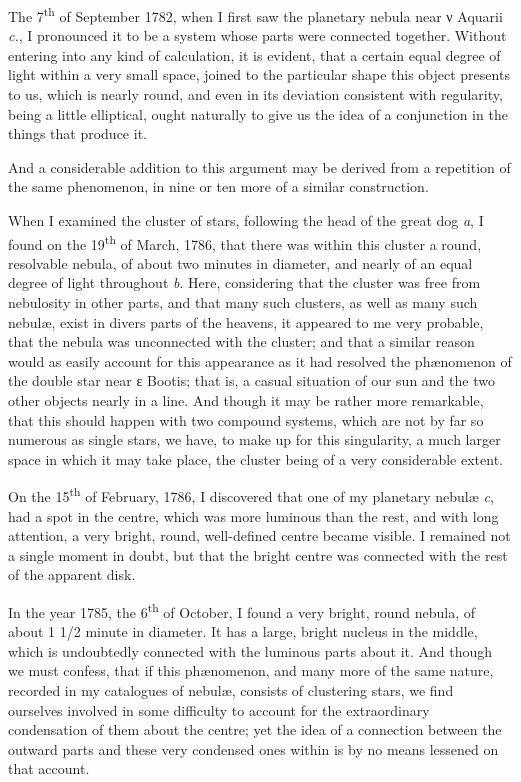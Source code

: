 \documentclass[a4paper, 12pt, oneside, polutonikogreek, english]{article}
\begin{document}
The 7\textsuperscript{th} of September 1782, when I first saw the planetary nebula near ν Aquarii \emph{c.}, I pronounced it to be a system whose parts were connected together. Without entering into any kind of calculation, it is evident, that a certain equal degree of light within a very small space, joined to the particular shape this object presents to us, which is nearly round, and even in its deviation consistent with regularity, being a little elliptical, ought naturally to give us the idea of a conjunction in the things that produce it.

And a considerable addition to this argument may be derived from a repetition of the same phenomenon, in nine or ten more of a similar construction.

When I examined the cluster of stars, following the head of the great dog \emph{a}, I found on the 19\textsuperscript{th} of March, 1786, that there was within this cluster a round, resolvable nebula, of about two minutes in diameter, and nearly of an equal degree of light throughout \emph{b}. Here, considering that the cluster was free from nebulosity in other parts, and that many such clusters, as well as many such nebulæ, exist in divers parts of the heavens, it appeared to me very probable, that the nebula was unconnected with the cluster; and that a similar reason would as easily account for this appearance as it had resolved the phænomenon of the double star near ε Bootis; that is, a casual situation of our sun and the two other objects nearly in a line. And though it may be rather more remarkable, that this should happen with two compound systems, which are not by far so numerous as single stars, we have, to make up for this singularity, a much larger space in which it may take place, the cluster being of a very considerable extent.

On the 15\textsuperscript{th} of February, 1786, I discovered that one of my planetary nebulæ \emph{c}, had a spot in the centre, which was more luminous than the rest, and with long attention, a very bright, round, well-defined centre became visible. I remained not a single moment in doubt, but that the bright centre was connected with the rest of the apparent disk.

In the year 1785, the 6\textsuperscript{th} of October, I found a very bright, round nebula, of about 1 1/2 minute in diameter. It has a large, bright nucleus in the middle, which is undoubtedly connected with the luminous parts about it. And though we must confess, that if this phænomenon, and many more of the same nature, recorded in my catalogues of nebulæ, consists of clustering stars, we find ourselves involved in some difficulty to account for the extraordinary condensation of them about the centre; yet the idea of a connection between the outward parts and these very condensed ones within is by no means lessened on that account.
\end{document}
